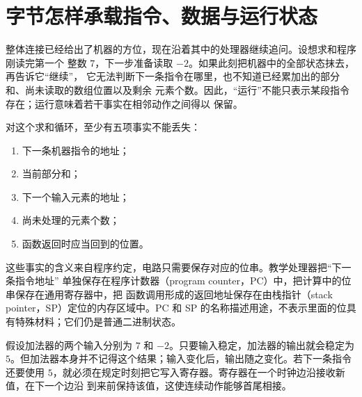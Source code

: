 \section{字节怎样承载指令、数据与运行状态}

整体连接已经给出了机器的方位，现在沿着其中的处理器继续追问。设想求和程序刚读完第一个
整数 \(7\)，下一步准备读取 \(-2\)。如果此刻把机器中的全部状态抹去，再告诉它“继续”，
它无法判断下一条指令在哪里，也不知道已经累加出的部分和、尚未读取的数组位置以及剩余
元素个数。因此，“运行”不能只表示某段指令存在；运行意味着若干事实在相邻动作之间得以
保留。

对这个求和循环，至少有五项事实不能丢失：

\begin{enumerate}
\item 下一条机器指令的地址；
\item 当前部分和；
\item 下一个输入元素的地址；
\item 尚未处理的元素个数；
\item 函数返回时应当回到的位置。
\end{enumerate}

这些事实的含义来自程序约定，电路只需要保存对应的位串。教学处理器把“下一条指令地址”
单独保存在程序计数器（program counter，PC）中，把计算中的位串保存在通用寄存器中，把
函数调用形成的返回地址保存在由栈指针（stack pointer，SP）定位的内存区域中。PC 和 SP
的名称描述用途，不表示里面的位具有特殊材料；它们仍是普通二进制状态。


假设加法器的两个输入分别为 \(7\) 和 \(-2\)。只要输入稳定，加法器的输出就会稳定为
\(5\)。但加法器本身并不记得这个结果；输入变化后，输出随之变化。若下一条指令还要使用
\(5\)，就必须在规定时刻把它写入寄存器。寄存器在一个时钟边沿接收新值，在下一个边沿
到来前保持该值，这使连续动作能够首尾相接。

\begin{center}
\end{center}

